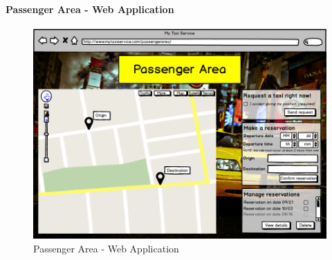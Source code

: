 		\paragraph{Passenger Area - Web Application}
		\begin{figure}[!h]
			\begin{center}
				\includegraphics[scale=0.45]{../SE2_MOCKUPS/WebAppPassengerArea.png}
				\caption{Passenger Area - Web Application}
			\end{center}	
		\end{figure}
		\newpage
